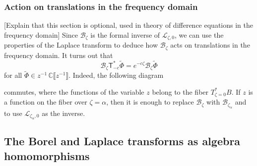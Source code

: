 \documentclass{article}
\newcommand{\C}{\mathbb{C}}
\newcommand{\series}[1]{\tilde{#1}}
\newcommand{\laplace}{\mathcal{L}}
\newcommand{\borel}{\mathcal{B}}
\theoremstyle{definition}
\theoremstyle{plain}
\newenvironment{todo}{\color{Coral}}{\color{black}}
\begin{document}
\subsubsection{Action on translations in the frequency domain}
\begin{todo}[Explain that this section is optional, used in theory of difference equations in the frequency domain]\end{todo} Since $\borel_\zeta$ is the formal inverse of $\laplace_{\zeta,0}$, we can use the properties of the Laplace transform to deduce how $\borel_\zeta$ acts on translations in the frequency domain. It turns out that 
\[ \borel_\zeta \mathsf{T}_{-c}^* \series{\Phi} = e^{-c\zeta }\borel_\zeta \series{\Phi} \]
for all $\series{\Phi} \in z^{-1}\,\C\llbracket z^{-1} \rrbracket$.
Indeed, the following diagram
\begin{center}
\end{center}
commutes, where the functions of the variable $z$ belong to the fiber $T^*_{\zeta=0}B$. If $z$ is a function on the fiber over $\zeta=\alpha$, then it is enough to replace $\borel_\zeta$ with $\borel_{\zeta_\alpha}$ and to use  $\laplace_{\zeta_\alpha,0}$ as the inverse. 
%
\subsection{The Borel and Laplace transforms as algebra homomorphisms}\label{sec:borel-laplace-homom}
%
\end{document}
